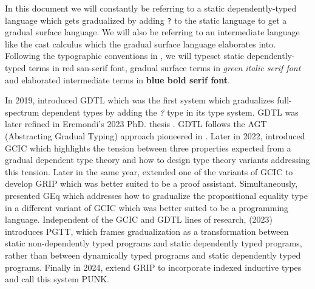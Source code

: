 \documentclass{article}
\theoremstyle{definition}
\newcommand{\Scode}[1]{{\fontfamily{cmss}\selectfont\color{Mahogany}#1}}
\newcommand{\Gcode}[1]{{\color{OliveGreen}\textit{#1}}}
\newcommand{\Ccode}[1]{{\color{BlueViolet}\textbf{#1}}}
\begin{document}
In this document we will constantly be referring to a static dependently-typed
language which gets gradualized by adding \verb|?| to the static language to get
a gradual surface language. We will also be referring to an intermediate
language like the cast calculus which the gradual surface language elaborates
into. Following the typographic conventions in \citet{eremondi_design_2023}, we
will typeset static dependently-typed terms in \Scode{red san-serif font},
gradual surface terms in \Gcode{green italic serif font} and elaborated
intermediate terms in \Ccode{blue bold serif font}.

In 2019, \citet{eremondi_approximate_2019} introduced GDTL which was the first
system which gradualizes full-spectrum dependent types by adding the \Gcode{?}
type in its type system. GDTL was later refined in Eremondi's 2023 PhD. thesis
\cite{eremondi_design_2023}. GDTL follows the AGT (Abstracting Gradual Typing)
approach pioneered in \citet{garcia_abstracting_2016}. Later in 2022,
\citet{lennon-bertrand_gradualizing_2022} introduced GCIC which highlights the
tension between three properties expected from a gradual dependent type theory
and how to design type theory variants addressing this tension. Later in the
same year, \citet{maillard_reasonably_2022} extended one of the variants of GCIC
to develop GRIP which was better suited to be a proof assistant. Simultaneously,
\citet{eremondi_propositional_2022} presented GEq which addresses how to
gradualize the propositional equality type in a different variant of GCIC which
was better suited to be a programming language. Independent of the GCIC and GDTL
lines of research, \citet{shi_partial_2023} (2023) introduces PGTT, which frames
gradualization as a transformation between static non-dependently typed programs
and static dependently typed programs, rather than between dynamically typed
programs and static dependently typed programs. Finally in 2024,
\citet{malewski_gradual_2024} extend GRIP to incorporate indexed inductive types
and call this system PUNK.
\end{document}
